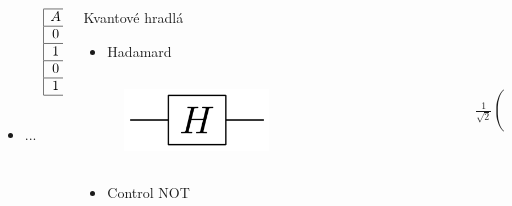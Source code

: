 \documentclass{beamer}
\begin{document}
\begin{frame}
\begin{columns}[t]
\begin{column}{.5\textwidth}
\begin{columns}[c]
\begin{column}{.5\textwidth}
\begin{figure}
					\end{figure}
				\end{column}
				\begin{column}{.5\textwidth}
					\begin{displaymath}
						\begin{array}{|c c|c|}
							\hline
							A & B & Q \\ 
							\hline 
							0 & 0 & 0 \\
							\hline
							1 & 0 & 0 \\
							\hline
							0 & 1 & 0 \\
							\hline
							1 & 1 & 1 \\
							\hline
						\end{array}   
					\end{displaymath}
				\end{column}
			\end{columns}
			\begin{itemize}
				\item ...
			\end{itemize}
						
		\end{column}
				
		\begin{column}{.5\textwidth}
			\centering
			Kvantové hradlá
			\vspace{0.4cm}
			\begin{itemize}
				\item Hadamard
			\end{itemize}
								
			\begin{columns}[c]
				\begin{column}{.5\textwidth}
					\begin{figure}
						\centering
						\includegraphics[width=0.5\textwidth]{hadamard_gate.png}
					\end{figure}
				\end{column}
								
				\begin{column}{.5\textwidth}
					$\frac{1}{\sqrt{2}}\begin{pmatrix}
					1 & 1\\
					1 & -1\\
					\end{pmatrix}$
				\end{column}
			\end{columns}  
			\begin{itemize}
				\item Control NOT
			\end{itemize}
							

\end{column}
\end{columns}
\end{frame}
\end{document}

